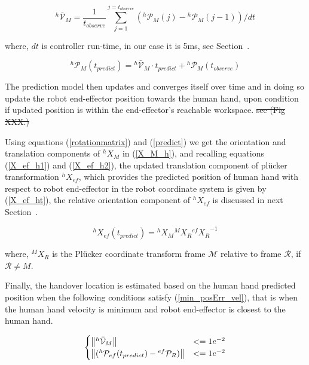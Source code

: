 \begin{equation} \label{predictVel}
{}^{h}\mathcal{\bar{V}}_{M} = \frac{1}{t_{observe}}{\sum_{j=1}^{j=t_{observe}} ({}^{h}\mathcal{P}_{M}(j)-{}^{h}\mathcal{P}_{M}(j-1))/dt }
\end{equation}

where, $dt$ is controller run-time, in our case it is 5ms, see Section~.

\begin{equation} \label{predict}
{}^{h}\mathcal{P}_M(t_{predict}) = {}^{h}\mathcal{\bar{V}}_{M} \cdot t_{predict}  + {}^{h}\mathcal{P}_{M}(t_{observe})
\end{equation}


The prediction model then updates and converges itself over time and in doing so update the robot end-effector position towards the human hand, upon condition if updated position is within the end-effector's reachable workspace. \sout{see (Fig XXX.)}

Using equations (\ref{rotationmatrix}) and (\ref{predict}) we get the orientation and translation components of ${}^{h}{X}_M$ in (\ref{X_M_h}), and recalling equations (\ref{X_ef_h1}) and (\ref{X_ef_h2}), the updated translation component of pl\"ucker transformation ${}^{h}{X}_{ef}$, which provides the predicted position of human hand with respect to robot end-effector in the robot coordinate system is given by (\ref{X_ef_ht}), the relative orientation component of ${}^{h}{X}_{ef}$ is discussed in next Section~.

\begin{equation}\label{X_ef_ht}
{}^{h}{X}_{ef}(t_{predict}) =  {}^{h}{X}_M  {}^{M}{X}_R {{}^{ef}{X}_R}^{-1}
\end{equation}

where, ${}^{M}{X}_R$ is the Pl\"ucker coordinate transform frame $\mathcal{M}$ relative to frame $\mathcal{R}$, if $\mathcal R \neq M$.


Finally, the handover location is estimated based on the human hand predicted position when the following conditions satisfy (\ref{min_posErr_vel}), that is when the human hand velocity is minimum and robot end-effector is closest to the human hand.

\begin{equation}\label{min_posErr_vel}
\begin{cases}
	\norm{{}^{h}\mathcal{\bar{V}}_{M}}& <= 1e^{-2} \\
	\norm{({}^{h}\mathcal{P}_{ef}(t_{predict}) - {}^{ef}\mathcal{P}_{R})} & <= 1e^{-2}
\end{cases}
\end{equation}

